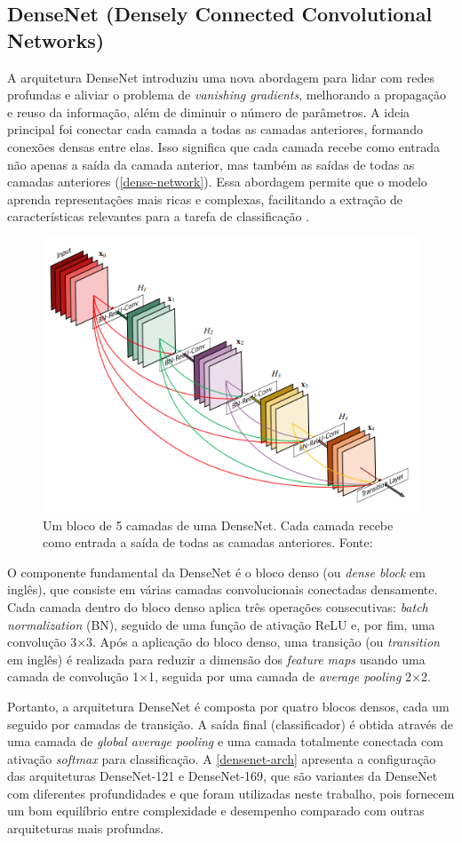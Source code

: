 \subsection{DenseNet (Densely Connected Convolutional Networks)}

A arquitetura DenseNet introduziu uma nova abordagem para lidar com redes profundas e aliviar o problema de \textit{vanishing gradients}, melhorando a propagação e reuso da informação, além de diminuir o número de parâmetros. A ideia principal foi conectar cada camada a todas as camadas anteriores, formando conexões densas entre elas. Isso significa que cada camada recebe como entrada não apenas a saída da camada anterior, mas também as saídas de todas as camadas anteriores (\autoref{dense-network}). Essa abordagem permite que o modelo aprenda representações mais ricas e complexas, facilitando a extração de características relevantes para a tarefa de classificação \citep{Huang2017}.

\begin{figure}[h]
    \centering
    \includegraphics[width=0.5\linewidth]{figs/dense-network.png}
    \caption{Um bloco de 5 camadas de uma DenseNet. Cada camada recebe como entrada a saída de todas as camadas anteriores. Fonte: \cite{Huang2017}}
    \label{dense-network}
\end{figure}

O componente fundamental da DenseNet é o bloco denso (ou \textit{dense block} em inglês), que consiste em várias camadas convolucionais conectadas densamente. Cada camada dentro do bloco denso aplica três operações consecutivas: \textit{batch normalization} (BN), seguido de uma função de ativação ReLU e, por fim, uma convolução 3×3. Após a aplicação do bloco denso, uma transição (ou \textit{transition} em inglês) é realizada para reduzir a dimensão dos \textit{feature maps} usando uma camada de convolução 1×1, seguida por uma camada de \textit{average pooling} 2×2.

Portanto, a arquitetura DenseNet é composta por quatro blocos densos, cada um seguido por camadas de transição. A saída final (classificador) é obtida através de uma camada de \textit{global average pooling} e uma camada totalmente conectada com ativação \textit{softmax} para classificação. A \autoref{densenet-arch} apresenta a configuração das arquiteturas DenseNet-121 e DenseNet-169, que são variantes da DenseNet com diferentes profundidades e que foram utilizadas neste trabalho, pois fornecem um bom equilíbrio entre complexidade e desempenho comparado com outras arquiteturas mais profundas.

